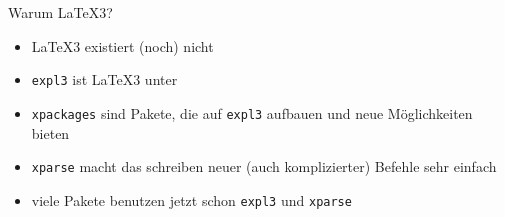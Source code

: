 \begin{frame}{Warum \LaTeX3?}
  \begin{itemize}
    \item \LaTeX3 existiert (noch) nicht
    \item \texttt{expl3} ist \LaTeX3 unter \LaTeXe
    \item \texttt{xpackages} sind Pakete, die auf \texttt{expl3} aufbauen und neue Möglichkeiten bieten
    \item \texttt{xparse} macht das schreiben neuer (auch komplizierter) Befehle sehr einfach
    \item viele Pakete benutzen jetzt schon \texttt{expl3} und \texttt{xparse}
  \end{itemize}
\end{frame}
